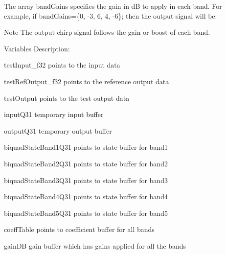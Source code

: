 \begin{DoxyParagraph}{}
 
\end{DoxyParagraph}
\begin{DoxyParagraph}{}
The array {\ttfamily band\-Gains} specifies the gain in d\-B to apply in each band. For example, if {\ttfamily band\-Gains=\{0, -\/3, 6, 4, -\/6\};} then the output signal will be\-: 
\end{DoxyParagraph}
\begin{DoxyParagraph}{}
 
\end{DoxyParagraph}
\begin{DoxyParagraph}{}

\end{DoxyParagraph}
\begin{DoxyNote}{Note}
The output chirp signal follows the gain or boost of each band. 
\end{DoxyNote}
\begin{DoxyParagraph}{}

\end{DoxyParagraph}
\begin{DoxyParagraph}{Variables Description\-:}

\end{DoxyParagraph}
\begin{DoxyParagraph}{}
\begin{DoxyItemize}
\item {\ttfamily test\-Input\-\_\-f32} points to the input data \item {\ttfamily test\-Ref\-Output\-\_\-f32} points to the reference output data \item {\ttfamily test\-Output} points to the test output data \item {\ttfamily input\-Q31} temporary input buffer \item {\ttfamily output\-Q31} temporary output buffer \item {\ttfamily biquad\-State\-Band1\-Q31} points to state buffer for band1 \item {\ttfamily biquad\-State\-Band2\-Q31} points to state buffer for band2 \item {\ttfamily biquad\-State\-Band3\-Q31} points to state buffer for band3 \item {\ttfamily biquad\-State\-Band4\-Q31} points to state buffer for band4 \item {\ttfamily biquad\-State\-Band5\-Q31} points to state buffer for band5 \item {\ttfamily coeff\-Table} points to coefficient buffer for all bands \item {\ttfamily gain\-D\-B} gain buffer which has gains applied for all the bands\end{DoxyItemize}

\end{DoxyParagraph}
